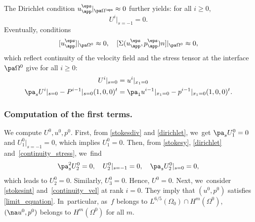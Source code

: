 The Dirichlet condition $u^\eps_{\app}\vert_{\pa \Omega^\eps} \approx 0$ further yields: for all $i \ge 0$,
\begin{equation} \label{dirichlet}
U^i\vert_{s = -1} = 0.
\end{equation}
Eventually, conditions
\[
[u^\eps_{\app}]\vert_{\pa \Omega^0} \approx 0, \quad [\Sigma(u^\eps_{\app},p^\eps_{\app})n]\vert_{\pa \Omega^0} \approx 0,
\]
which reflect continuity of the velocity field and the stress tensor at the interface $\pa \Omega^0$ give for all $i \ge 0$:
\begin{align}
U^i\vert_{s=0} & = u^i\vert_{x_1=0} \label{continuity_vel} \\
\pa_s U^i \vert_{s=0} - P^{i-1}\vert_{s=0} (1,0,0)^t & = \pa_1 u^{i-1}\vert_{x_1=0} - p^{i-1}\vert_{x_1=0} (1,0,0)^t. \label{continuity_stress}
\end{align}

\subsubsection*{Computation of the first terms.} We compute $U^0, u^0,p^0$. First, from \eqref{stokesdiv} and \eqref{dirichlet}, we~get $\pa_s U^0_1 = 0$ and $U^0_1\vert_{s=-1} = 0$, which implies $U^0_1 = 0$. Then, from \eqref{stokesy}, \eqref{dirichlet} and~\eqref{continuity_stress}, we~find
\[
\pa^2_s U^0_2 = 0, \quad U^0_2\vert_{s=-1} = 0, \quad \pa_s U^0_2\vert_{s=0} = 0,
\]
which leads to $U^0_2 = 0$. Similarly, $U^0_3 = 0$. Hence, $U^0 = 0$. Next, we~consider \eqref{stokesint} and~\eqref{continuity_vel} at rank $i=0$. They imply that $(u^0,p^0)$ satisfies \eqref{limit_equation}. In~particular, as~$f$ belongs to $L^{6/5}(\Omega_0) \cap H^m(\Omega^0)$, $(\na u^0,p^0)$ belongs to $H^m(\Omega^0)$ for all $m$.

